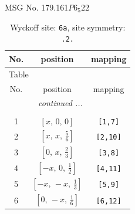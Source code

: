 \documentclass[fleqn,8pt]{jsarticle}
\begin{document}
\setcounter{MaxMatrixCols}{32}

\renewcommand{\tablename}{Table~}
\renewcommand{\figurename}{Figure~}
\begin{center}
\LARGE
MSG No. 179.161\quad$P6_{5}22$
\end{center}
\renewcommand{\arraystretch}{1.2}
\begin{longtable}{ccc}
\caption{Wyckoff site: {\tt 6a}, site symmetry: {\tt .2.}}
 \\
 \hline \hline
No. & position & mapping \\ \hline \endfirsthead

\multicolumn{2}{l}{\tablename\ \thetable{}} \\
 \hline \hline
No. & position & mapping \\ \hline \endhead

 \hline \hline
\multicolumn{2}{r}{\footnotesize\it continued ...} \\ \endfoot

 \hline \hline
\multicolumn{2}{r}{} \\ \endlastfoot

1 & $\left[ x,\, 0,\, 0 \right]$ & {\tt [1,7]} \\ \hline
2 & $\left[ x,\, x,\, \frac{5}{6} \right]$ & {\tt [2,10]} \\ \hline
3 & $\left[ 0,\, x,\, \frac{2}{3} \right]$ & {\tt [3,8]} \\ \hline
4 & $\left[ - x,\, 0,\, \frac{1}{2} \right]$ & {\tt [4,11]} \\ \hline
5 & $\left[ - x,\, - x,\, \frac{1}{3} \right]$ & {\tt [5,9]} \\ \hline
6 & $\left[ 0,\, - x,\, \frac{1}{6} \right]$ & {\tt [6,12]} \\
\end{longtable}
\renewcommand{\arraystretch}{1.2}
\end{document}
